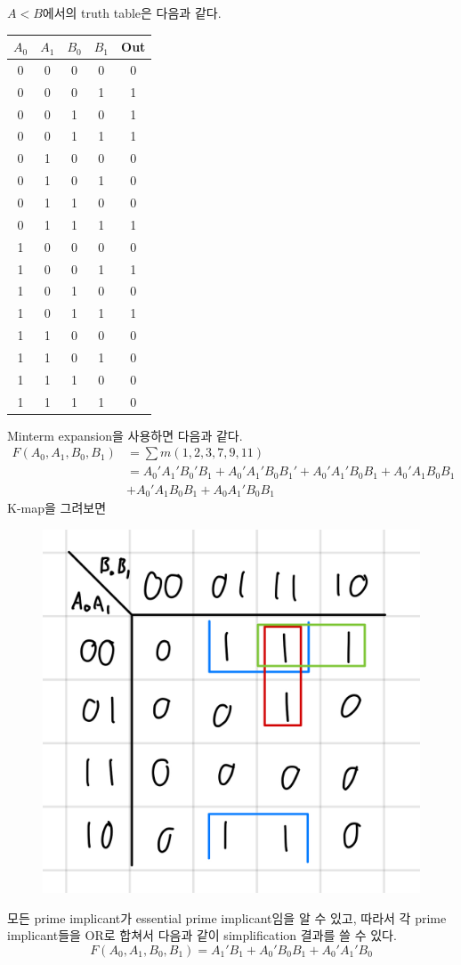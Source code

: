 \documentclass{scrartcl}
\begin{document}
\(A < B\)에서의 truth table은 다음과 같다.
\begin{table}[H]
  \centering
  \begin{tabular}{|cccc|c|}
  \hline
  \(A_0\) & \(A_1\) & \(B_0\) & \(B_1\) & Out \\ \hline
  0       & 0       & 0       & 0       & 0   \\
  0       & 0       & 0       & 1       & 1   \\
  0       & 0       & 1       & 0       & 1   \\
  0       & 0       & 1       & 1       & 1   \\
  0       & 1       & 0       & 0       & 0   \\
  0       & 1       & 0       & 1       & 0   \\
  0       & 1       & 1       & 0       & 0   \\
  0       & 1       & 1       & 1       & 1   \\
  1       & 0       & 0       & 0       & 0   \\
  1       & 0       & 0       & 1       & 1   \\
  1       & 0       & 1       & 0       & 0   \\
  1       & 0       & 1       & 1       & 1   \\
  1       & 1       & 0       & 0       & 0   \\
  1       & 1       & 0       & 1       & 0   \\
  1       & 1       & 1       & 0       & 0   \\
  1       & 1       & 1       & 1       & 0   \\ \hline
  \end{tabular}
\end{table}
Minterm expansion을 사용하면 다음과 같다.
\begin{align*}
  F(A_0, A_1, B_0, B_1) &= \sum m(1, 2, 3, 7, 9, 11) \\
                        &= A_0' A_1' B_0' B_1 + A_0' A_1' B_0 B_1' + A_0' A_1' B_0 B_1 + A_0' A_1 B_0 B_1 \\
                        &+ A_0' A_1 B_0 B_1 + A_0 A_1' B_0 B_1
\end{align*}
K-map을 그려보면
\begin{figure}[H]
  \centering
  \includegraphics[width=0.4\linewidth]{LT_KM}
\end{figure}
모든 prime implicant가 essential prime implicant임을 알 수 있고, 따라서 각 prime implicant들을 OR로 합쳐서 다음과 같이 simplification 결과를 쓸 수 있다.
\[
  F(A_0, A_1, B_0, B_1) = A_1' B_1 + A_0' B_0 B_1 + A_0' A_1' B_0
\]
\end{document}
